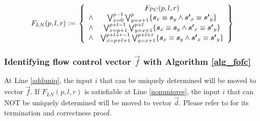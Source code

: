 \documentclass[runningheads,a4paper,orivec]{llncs}
\begin{document}
\begin{equation}\label{uniqln}
F_{LN}(p,l,r):=\\
\left\{
\begin{array}{cc}
&F_{PC}(p,l,r)\\
\wedge&\bigvee_{x=0}^{p-1}\bigvee_{y=x+1}^{p} \{\vec{s}_x\equiv \vec{s}_y\wedge \vec{s'}_x\equiv \vec{s'}_y\} \\
\wedge&\bigvee_{x=p+1}^{p+l-1}\bigvee_{y=x+1}^{p+l} \{\vec{s}_x\equiv \vec{s}_y\wedge \vec{s'}_x\equiv \vec{s'}_y\} \\
\wedge&\bigvee_{x=p+l+1}^{p+l+r-1}\bigvee_{y=x+1}^{p+l+r} \{\vec{s}_x\equiv \vec{s}_y\wedge \vec{s'}_x\equiv \vec{s'}_y\}
\end{array}
\right\}
\end{equation}



% 
% 

\subsubsection{Identifying flow control vector $\vec{f}$ with Algorithm \ref{alg_fofc}}\label{subsubsec_findfc}
% 
At Line \ref{adduniq},
the input $i$ that can be uniquely determined will be moved to vector $\vec{f}$.
If $F_{LN}(p,l,r)$ is satisfiable at Line \ref{nonuniqres},
the input $i$ that can NOT be uniquely determined will be moved to vector $\vec{d}$.
Please refer to \cite{QinTODAES15} for its termination and correctness proof.
\end{document}
